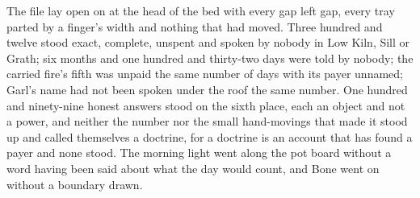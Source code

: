 The file lay open on  at the head of the bed with every gap left gap, every tray parted by a finger's width and nothing that had moved. Three hundred and twelve stood exact, complete, unspent and spoken by nobody in Low Kiln, Sill or Grath; six months and one hundred and thirty-two days were told by nobody; the carried fire's fifth was unpaid the same number of days with its payer unnamed; Garl's name had not been spoken under the roof the same number. One hundred and ninety-nine honest answers stood on the sixth place, each an object and not a power, and neither the number nor the small hand-movings that made it stood up and called themselves a doctrine, for a doctrine is an account that has found a payer and none stood. The morning light went along the pot board without a word having been said about what the day would count, and Bone went on without a boundary drawn.
